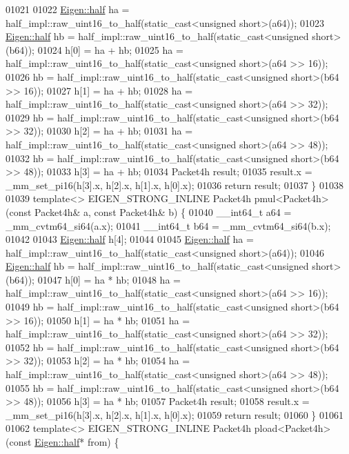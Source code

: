 \begin{DoxyCode}
01021 
01022   \hyperlink{struct_eigen_1_1half}{Eigen::half} ha = half\_impl::raw\_uint16\_to\_half(static\_cast<unsigned short>(a64));
01023   \hyperlink{struct_eigen_1_1half}{Eigen::half} hb = half\_impl::raw\_uint16\_to\_half(static\_cast<unsigned short>(b64));
01024   h[0] = ha + hb;
01025   ha = half\_impl::raw\_uint16\_to\_half(static\_cast<unsigned short>(a64 >> 16));
01026   hb = half\_impl::raw\_uint16\_to\_half(static\_cast<unsigned short>(b64 >> 16));
01027   h[1] = ha + hb;
01028   ha = half\_impl::raw\_uint16\_to\_half(static\_cast<unsigned short>(a64 >> 32));
01029   hb = half\_impl::raw\_uint16\_to\_half(static\_cast<unsigned short>(b64 >> 32));
01030   h[2] = ha + hb;
01031   ha = half\_impl::raw\_uint16\_to\_half(static\_cast<unsigned short>(a64 >> 48));
01032   hb = half\_impl::raw\_uint16\_to\_half(static\_cast<unsigned short>(b64 >> 48));
01033   h[3] = ha + hb;
01034   Packet4h result;
01035   result.x = \_mm\_set\_pi16(h[3].x, h[2].x, h[1].x, h[0].x);
01036   \textcolor{keywordflow}{return} result;
01037 \}
01038 
01039 \textcolor{keyword}{template}<> EIGEN\_STRONG\_INLINE Packet4h pmul<Packet4h>(\textcolor{keyword}{const} Packet4h& a, \textcolor{keyword}{const} Packet4h& b) \{
01040   \_\_int64\_t a64 = \_mm\_cvtm64\_si64(a.x);
01041   \_\_int64\_t b64 = \_mm\_cvtm64\_si64(b.x);
01042 
01043   \hyperlink{struct_eigen_1_1half}{Eigen::half} h[4];
01044 
01045   \hyperlink{struct_eigen_1_1half}{Eigen::half} ha = half\_impl::raw\_uint16\_to\_half(static\_cast<unsigned short>(a64));
01046   \hyperlink{struct_eigen_1_1half}{Eigen::half} hb = half\_impl::raw\_uint16\_to\_half(static\_cast<unsigned short>(b64));
01047   h[0] = ha * hb;
01048   ha = half\_impl::raw\_uint16\_to\_half(static\_cast<unsigned short>(a64 >> 16));
01049   hb = half\_impl::raw\_uint16\_to\_half(static\_cast<unsigned short>(b64 >> 16));
01050   h[1] = ha * hb;
01051   ha = half\_impl::raw\_uint16\_to\_half(static\_cast<unsigned short>(a64 >> 32));
01052   hb = half\_impl::raw\_uint16\_to\_half(static\_cast<unsigned short>(b64 >> 32));
01053   h[2] = ha * hb;
01054   ha = half\_impl::raw\_uint16\_to\_half(static\_cast<unsigned short>(a64 >> 48));
01055   hb = half\_impl::raw\_uint16\_to\_half(static\_cast<unsigned short>(b64 >> 48));
01056   h[3] = ha * hb;
01057   Packet4h result;
01058   result.x = \_mm\_set\_pi16(h[3].x, h[2].x, h[1].x, h[0].x);
01059   \textcolor{keywordflow}{return} result;
01060 \}
01061 
01062 \textcolor{keyword}{template}<> EIGEN\_STRONG\_INLINE Packet4h pload<Packet4h>(\textcolor{keyword}{const} \hyperlink{struct_eigen_1_1half}{Eigen::half}* from) \{

\end{DoxyCode}
